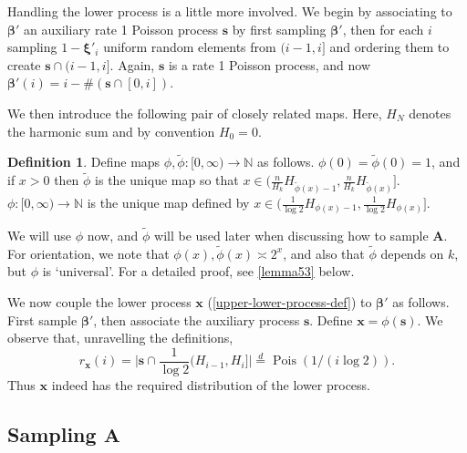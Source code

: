 \documentclass[11pt,reqno]{amsart}
\numberwithin{equation}{section}
\theoremstyle{definition}
\newtheorem{definition}[theorem]{Definition}
\theoremstyle{remark}
\newcommand{\mbf}{\mathbf}
\newcommand\Pois{\operatorname{Pois}}
\def\boldbeta{\boldsymbol\beta}
\def\boldxi{\boldsymbol\xi}
\newcommand\N{\mathbb{N}}
\newcommand\samedist{\overset{d}{=}}
\begin{document}
Handling the lower process is a little more involved. We begin by associating to $\boldbeta'$ an auxiliary rate 1 Poisson process $\mbf{s}$ by first sampling $\boldbeta'$, then for each $i$ sampling $1 - \boldxi'_i$ uniform random elements from $(i-1,i]$ and ordering them to create $\mbf{s} \cap (i-1,i]$. Again, $\mbf{s}$ is a rate 1 Poisson process, and now $\boldbeta'(i) = i - \# (\mbf{s} \cap [0,i])$.

We then introduce the following pair of closely related maps. Here, $H_N$ denotes the harmonic sum and by convention $H_0 = 0$.

\begin{definition}\label{phis-def}
Define maps $\phi, \tilde\phi : [0,\infty) \rightarrow \N$ as follows. $\phi(0) = \tilde\phi(0) = 1$, and if $x > 0$ then $\tilde\phi$ is the unique map so that $x \in (\frac{n}{H_k} H_{\tilde\phi(x)-1}, \frac{n}{H_k}H_{\tilde\phi(x)}]$. $\phi : [0,\infty) \rightarrow \N$ is the unique map defined by $x \in (\frac{1}{\log 2} H_{\phi(x)-1}, \frac{1}{\log 2}H_{\phi(x)}]$.
\end{definition}
We will use $\phi$ now, and $\tilde\phi$ will be used later when discussing how to sample $\mbf{A}$.
For orientation, we note that $\phi(x), \tilde\phi(x) \asymp 2^x$, and also that $\tilde\phi$ depends on $k$, but $\phi$ is `universal'. For a detailed proof, see \cref{lemma53} below.

We now couple the lower process $\mbf{x}$ (\cref{upper-lower-process-def}) to $\boldbeta'$ as follows. First sample $\boldbeta'$, then associate the auxiliary process $\mbf{s}$. Define $\mbf{x} = \phi(\mbf{s})$. We observe that, unravelling the definitions, 
\[ r_{\mbf{x}}(i) = \big| \mbf{s} \cap \frac{1}{\log 2} (H_{i-1},  H_i] \big|\samedist \Pois(1/(i \log 2)). \] Thus $\mbf{x}$ indeed has the required distribution of the lower process.
 


\subsection{Sampling $\mbf{A}$}
\end{document}
